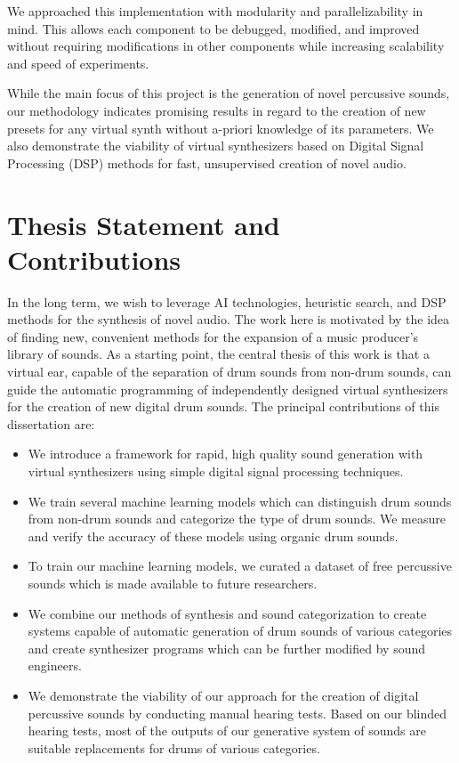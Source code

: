 \documentclass[\main/thesis.tex]{subfiles}
\begin{document}
We approached this implementation with modularity and parallelizability in mind. This allows each component to be debugged, modified, and improved without requiring modifications in other components while increasing scalability and speed of experiments. 


While the main focus of this project is the generation of novel percussive sounds, our methodology indicates promising results in regard to the creation of new presets for any virtual synth without a-priori knowledge of its parameters. We also demonstrate the viability of virtual synthesizers based on Digital Signal Processing (DSP) methods for fast, unsupervised creation of novel audio. 




\section{Thesis Statement and Contributions}
In the long term, we wish to leverage AI technologies, heuristic search, and DSP methods for the synthesis of novel audio. The work here is motivated by the idea of finding new, convenient methods for the expansion of a music producer's library of sounds. As a starting point, the central thesis of this work is that a virtual ear, capable of the separation of drum sounds from non-drum sounds, can guide the automatic programming of independently designed virtual synthesizers for the creation of new digital drum sounds. The principal contributions of this dissertation are:
\begin{itemize}
  \item We introduce a framework for rapid, high quality sound generation with virtual synthesizers using simple digital signal processing techniques. 
  \item We train several machine learning models which can distinguish drum sounds from non-drum sounds and categorize the type of drum sounds. We measure and verify the accuracy of these models using organic drum sounds. 
  \item To train our machine learning models, we curated a dataset of free percussive sounds which is made available to future researchers. 
  \item We combine our methods of synthesis and sound categorization to create systems capable of automatic generation of drum sounds of various categories and create synthesizer programs which can be further modified by sound engineers.
  \item We demonstrate the viability of our approach for the creation of digital percussive sounds by conducting manual hearing tests. Based on our blinded hearing tests, most of the outputs of our generative system of sounds are suitable replacements for drums of various categories. 
\end{itemize}
\end{document}
